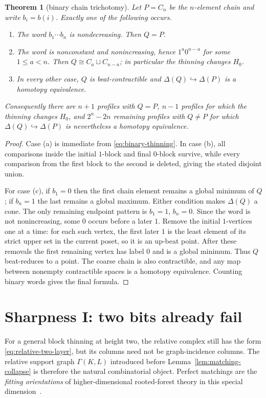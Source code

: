 \documentclass[11pt]{article}
\newtheorem{theorem}{Theorem}[section]
\theoremstyle{definition}
\theoremstyle{remark}
\newcommand{\D}{\Delta}
\begin{document}
\begin{theorem}[binary chain trichotomy]\label{thm:chain}
Let $P=C_n$ be the $n$-element chain and write $b_i=b(i)$.  Exactly one of the following
occurs.
\begin{enumerate}[label=(\alph*)]
\item The word $b_1\cdots b_n$ is nondecreasing.  Then $Q=P$.
\item The word is nonconstant and nonincreasing, hence $1^a0^{n-a}$ for some
$1\le a<n$.  Then $Q\cong C_a\sqcup C_{n-a}$; in particular the thinning changes
$H_0$.
\item In every other case, $Q$ is beat-contractible and
$\D(Q)\hookrightarrow\D(P)$ is a homotopy equivalence.
\end{enumerate}
Consequently there are $n+1$ profiles with $Q=P$, $n-1$ profiles for which the
thinning changes $H_0$, and $2^n-2n$ remaining profiles with $Q\ne P$ for which
$\D(Q)\hookrightarrow\D(P)$ is nevertheless a homotopy equivalence.
\end{theorem}

\begin{proof}
Case (a) is immediate from \eqref{eq:binary-thinning}.  In case (b), all comparisons
inside the initial $1$-block and final $0$-block survive, while every comparison from
the first block to the second is deleted, giving the stated disjoint union.

For case (c), if $b_1=0$ then the first chain element remains a global minimum of $Q$;
if $b_n=1$ the last remains a global maximum.  Either condition makes $\D(Q)$ a cone.
The only remaining endpoint pattern is $b_1=1$, $b_n=0$.  Since the word is not
nonincreasing, some $0$ occurs before a later $1$.  Remove the initial $1$-vertices one
at a time: for each such vertex, the first later $1$ is the least element of its strict
upper set in the current poset, so it is an up-beat point.  After these removals the
first remaining vertex has label $0$ and is a global minimum.  Thus $Q$ beat-reduces
to a point.  The coarse chain is also contractible, and any map between nonempty
contractible spaces is a homotopy equivalence.  Counting binary words gives the final
formula.
\end{proof}

\section{Sharpness I: two bits already fail}\label{sec:twobit}

For a general block thinning at height two, the relative complex still has the form
\eqref{eq:relative-two-layer}, but its columns need not be graph-incidence columns.
The relative support graph $\Gamma(K,L)$ introduced before
Lemma~\ref{lem:matching-collapse} is therefore the natural combinatorial object.
Perfect matchings are the \emph{fitting orientations} of higher-dimensional
rooted-forest theory in this special dimension~\cite{BernardiKlivans2016,DuvalKlivansMartin2016}.
\end{document}
